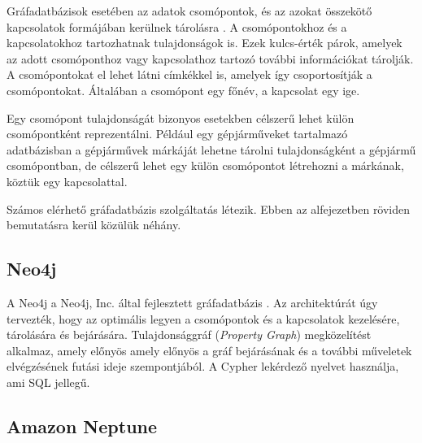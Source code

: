 
Gráfadatbázisok esetében az adatok csomópontok, és az azokat összekötő kapcsolatok formájában kerülnek tárolásra \cite{adatok-leirasa}. A csomópontokhoz és a kapcsolatokhoz tartozhatnak tulajdonságok is. Ezek kulcs-érték párok, amelyek az adott csomóponthoz vagy kapcsolathoz tartozó további információkat tárolják. A csomópontokat el lehet látni címkékkel is, amelyek így csoportosítják a csomópontokat. Általában a csomópont egy főnév, a kapcsolat egy ige.

\bigskip

Egy csomópont tulajdonságát bizonyos esetekben célszerű lehet külön csomópontként reprezentálni. Például egy gépjárműveket tartalmazó adatbázisban a gépjárművek márkáját lehetne tárolni tulajdonságként a gépjármű csomópontban, de célszerű lehet egy külön csomópontot létrehozni a márkának, köztük egy kapcsolattal.


Számos elérhető gráfadatbázis szolgáltatás létezik. Ebben az alfejezetben röviden bemutatásra kerül közülük néhány.

\subsection{Neo4j}

A Neo4j a Neo4j, Inc. által fejlesztett gráfadatbázis \cite{neo4j}. Az architektúrát úgy tervezték, hogy az optimális legyen a csomópontok és a kapcsolatok kezelésére, tárolására és bejárására. Tulajdonsággráf (\textit{Property Graph}) megközelítést alkalmaz, amely előnyös amely előnyös a gráf bejárásának és a további műveletek elvégzésének futási ideje szempontjából. A Cypher lekérdező nyelvet használja, ami SQL jellegű.

\subsection{Amazon Neptune}


